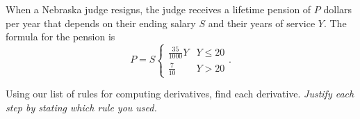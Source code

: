 \documentclass[12pt,fleqn]{exam}
\begin{document}
\begin{questions}
\question[1] When a Nebraska judge resigns, the judge receives a lifetime pension of $P$ dollars per year that depends on their ending salary $S$ and their years of service $Y$. The formula for the pension is
\begin{equation}
  P = S \begin{cases}  \frac{35}{1000} Y &  Y \leq 20 \\  \frac{7}{10} &  Y >  20 \end{cases}.
  \end{equation}
  
  
  \question Using our list of rules for computing derivatives, find each derivative.  \emph{Justify each step by stating which rule you used.}
  
\end{questions}
\end{document}
